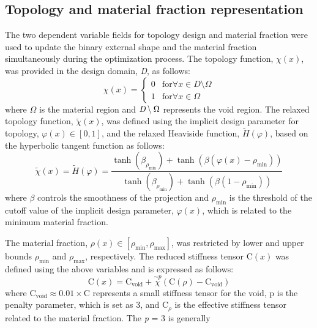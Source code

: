 \documentclass[a4paper,7pt,fleqn]{article}   %
\begin{document}
\begin{multicols}{2}
		\subsection{Topology and material fraction representation}
		The two dependent variable fields for topology design and material
		fraction were used to update the binary external shape and the material
		fraction simultaneously during the optimization process. The topology
		function, $\chi (x)$, was provided in the design domain, \emph{D}, as follows:
		\begin{equation}
			\chi (x) =\left\{\begin{matrix} 0 & \mathrm{for} \forall x\in D\setminus \Omega \\
				1 & \mathrm{for} \forall x\in \Omega\end{matrix}\right.
			\label{eq1}
		\end{equation}
		where $\Omega$ is the material region and $\emph{D}\setminus \Omega$ represents the void region. The
		relaxed topology function, $\tilde{\chi} (x)$, was defined using the implicit design
		parameter for topology, $\varphi (x) \in [0,1] $, and the relaxed Heaviside function,
		$\tilde{H} (\varphi) $, based on the hyperbolic tangent function as follows:
		\begin{equation}
			\tilde{\chi} (x)=\tilde{H}(\varphi) =\frac{\tanh (\beta _{\rho _{\min} } )+\tanh (\beta (\varphi (x)-\rho _{\min} ))}
			{\tanh (\beta _{\rho_{\min}})+\tanh (\beta (1-\rho _{\min})) } 
			\label{eq2}
		\end{equation}
		where $\beta$ controls the smoothness of the projection and $\rho _{\min}$ is the
		threshold of the cutoff value of the implicit design parameter, $\varphi (x)$,
		which is related to the minimum material fraction.\par
		The material fraction, $\rho (x)\in [\rho _{\min},\rho _{\max} ]$, was restricted by lower and
		upper bounds $\rho _{\min}$ and $\rho _{\max}$, respectively. The reduced stiffness tensor 
		$\bm{\mathrm{C}}(x)$ was defined using the above variables and is expressed as follows:
		\begin{equation}
			\mathrm{C}(x)=\mathrm{C}_{\mathrm{void}}+\overset{\sim p}{\chi}(\mathrm{C}(\rho)-\mathrm{C}_{\mathrm{void} })
			\label{eq3}
		\end{equation}
		where $\mathrm{C}_{\mathrm{void}}\approx 0.01\times \mathrm{C}$ represents a small stiffness tensor for the void, p
		is the penalty parameter, which is set as 3, and $\mathrm{C}_{\rho}$ is the effective
		stiffness tensor related to the material fraction. The \emph{p} = 3 is generally

\end{multicols}
\end{document}
